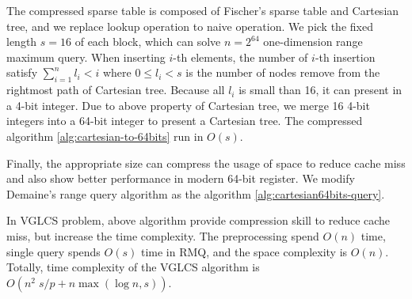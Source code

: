 The compressed sparse table is composed of Fischer's sparse table and
Cartesian tree, and we replace lookup operation to naive operation. We
pick the fixed length $s = 16$ of each block, which can solve $n =
2^{64}$ one-dimension range maximum query.  When inserting $i$-th
elements, the number of $i$-th insertion satisfy $\sum_{i=1}^{n} l_i <
i$ where $0 \le l_i < s$ is the number of nodes remove from the
rightmost path of Cartesian tree.  Because all $l_i$ is small than 16,
it can present in a 4-bit integer.  Due to above property of Cartesian
tree, we merge 16 4-bit integers into a 64-bit integer to present a
Cartesian tree. The compressed algorithm \ref{alg:cartesian-to-64bits}
run in $O(s)$.




Finally, the appropriate size can compress the usage of space to
reduce cache miss and also show better performance in modern 64-bit
register.  We modify Demaine's range query algorithm as the algorithm
\ref{alg:cartesian64bits-query}.



\iffalse
因所有 $l_i < 16$，使得每個 $l_i$ 可用 4-bit 表示之，
整體便可用 64-bit 長整數表示一棵笛卡爾樹的狀態。
為了現在常見的 64-byte 快取列 (cache line) 和 64-bit 暫存器 (register) 考量，
我們選用合適的大小進行測試，不僅壓縮空間使用量，同時也減少快取未中的問題。
最後，我們得到壓縮算法 \ref{alg:cartesian-to-64bits}，其相對應的區間查找算法，
根據 Demaine \cite{demaine} 進行修改，得到壓縮下的詢問算法 \ref{alg:cartesian64bits-query}。
\fi

In VGLCS problem, above algorithm provide compression skill to reduce
cache miss, but increase the time complexity.  The preprocessing spend
$O(n)$ time, single query spends $O(s)$ time in RMQ, and the space
complexity is  $O(n)$.  Totally, time complexity of the VGLCS algorithm
is $O(n^2 \; s / p + n \max(\log n, s))$.

\iffalse
回到 VGLCS 的應用中，上述算法使用壓縮方式降低快取未中。
我們可以使用上述的算法取代原先的并查集，建表的時間複雜度為 $O(n)$，
單一查詢的時間複雜度為 $O(s)$。
整體的時間複雜度為 $O(n^2 \; s / p + n \max(\log n, s))$。
\fi

